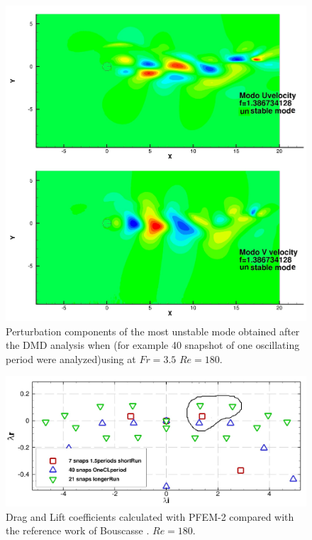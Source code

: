 \begin{figure}[ht]
  \centering
  \includegraphics[width=0.95\columnwidth]{images_10thspheric/modos3.jpeg}
  \caption{Perturbation components of the most unstable mode obtained after the DMD analysis when (for example 40 snapshot of one oscillating period were analyzed)using at $Fr=3.5$ $Re=180$.}
  \label{fg:CdCl}
\end{figure} 



\begin{figure}[ht]
  \centering
  \includegraphics[width=0.95\columnwidth]{images_10thspheric/7vs40vslongersnaps.jpg}
  \caption{Drag and Lift coefficients calculated with PFEM-2 compared with the reference work of Bouscasse \cite{Bouscasse14}. $Re=180$.} %
  \label{fg:CdCl}
\end{figure} 